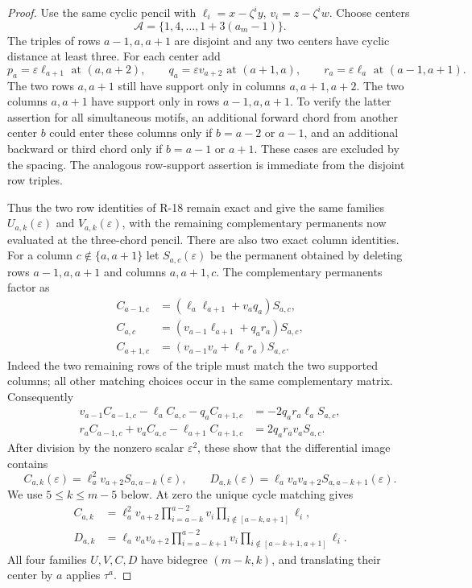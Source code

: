 \begin{proof}
Use the same cyclic pencil with
$\ell_i=x-\zeta^iy$, $v_i=z-\zeta^iw$.
Choose centers
\[
 \mathcal A=\{1,4,\ldots,1+3(a_m-1)\}.
\]
The triples of rows $a-1,a,a+1$ are disjoint and any two
centers have cyclic distance at least three.
For each center add
\begin{equation}\label{R19:threechords}
 p_a=\varepsilon\ell_{a+1}\text{ at }(a,a+2),\qquad
 q_a=\varepsilon v_{a+2}\text{ at }(a+1,a),\qquad
 r_a=\varepsilon\ell_a\text{ at }(a-1,a+1).
\end{equation}
The two rows $a,a+1$ still have support only in columns
$a,a+1,a+2$. The two columns $a,a+1$ have support only
in rows $a-1,a,a+1$. To verify the latter assertion for
all simultaneous motifs, an additional forward chord
from another center $b$ could enter these columns only
if $b=a-2$ or $a-1$, and an additional backward or third
chord only if $b=a-1$ or $a+1$. These cases are excluded
by the spacing. The analogous row-support assertion is
immediate from the disjoint row triples.

Thus the two row identities of R-18 remain exact and
give the same families $U_{a,k}(\varepsilon)$ and
$V_{a,k}(\varepsilon)$, with the remaining complementary
permanents now evaluated at the three-chord pencil.
There are also two exact column identities. For a column
$c\notin\{a,a+1\}$ let $S_{a,c}(\varepsilon)$ be the
permanent obtained by deleting rows $a-1,a,a+1$ and
columns $a,a+1,c$. The complementary permanents factor as
\[
 \begin{aligned}
 C_{a-1,c}&=(\ell_a\ell_{a+1}+v_aq_a)S_{a,c},\\
 C_{a,c}&=(v_{a-1}\ell_{a+1}+q_ar_a)S_{a,c},\\
 C_{a+1,c}&=(v_{a-1}v_a+\ell_ar_a)S_{a,c}.
 \end{aligned}
\]
Indeed the two remaining rows of the triple must match
the two supported columns; all other matching choices
occur in the same complementary matrix.
Consequently
\begin{align*}
 v_{a-1}C_{a-1,c}-\ell_a C_{a,c}-q_a C_{a+1,c}
    &=-2q_ar_a\ell_a S_{a,c},\\
 r_a C_{a-1,c}+v_a C_{a,c}-\ell_{a+1}C_{a+1,c}
    &= 2q_ar_av_a S_{a,c}.
\end{align*}
After division by the nonzero scalar $\varepsilon^2$,
these show that the differential image contains
\[
 C_{a,k}(\varepsilon)=\ell_a^2v_{a+2}S_{a,a-k}(\varepsilon),
 \qquad
 D_{a,k}(\varepsilon)=\ell_av_av_{a+2}S_{a,a-k+1}(\varepsilon).
\]
We use $5\leq k\leq m-5$ below.
At zero the unique cycle matching gives
\[
 \begin{aligned}
 C_{a,k}&=\ell_a^2v_{a+2}
       \prod_{i=a-k}^{a-2}v_i
       \prod_{i\notin[a-k,a+1]}\ell_i,\\
 D_{a,k}&=\ell_av_av_{a+2}
       \prod_{i=a-k+1}^{a-2}v_i
       \prod_{i\notin[a-k+1,a+1]}\ell_i.
 \end{aligned}
\]
All four families $U,V,C,D$ have bidegree $(m-k,k)$,
and translating their center by $a$ applies $\tau^a$.


\end{proof}
